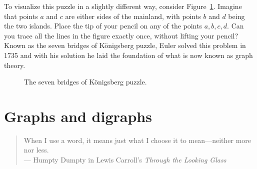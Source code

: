 To visualize this puzzle in a slightly different way, consider
Figure~\ref{fig:introduction:seven_bridges_Konigsberg}. Imagine that
points $a$ and $c$ are either sides of the mainland, with points $b$
and $d$ being the two islands. Place the tip of your pencil on any of
the points $a,b,c,d$. Can you trace all the lines in the figure
exactly once, without lifting your pencil? Known as the seven bridges
of K\"onigsberg puzzle, Euler solved this problem in 1735 and with his
solution he laid the foundation of what is now known as graph theory.

\begin{figure}[!htbp]
\centering
{}
\caption{The seven bridges of K\"onigsberg puzzle.}
\label{fig:introduction:seven_bridges_Konigsberg}
\end{figure}



\newpage

\section{Graphs and digraphs}
\label{sec:introduction:graphs_digraphs}

\begin{quote}
When I use a word, it means just what I choose it to mean---neither
more nor less.\\
\noindent
--- Humpty Dumpty in
Lewis Carroll's
\emph{Through the Looking Glass}
\end{quote}

